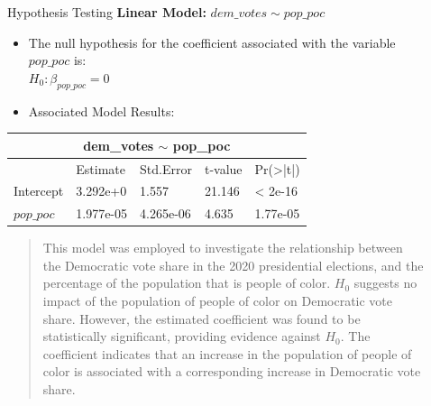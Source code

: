 \documentclass[xcolor=dvipsnames]{beamer}
\newlength{\sepwid}
\newlength{\onecolwid}
\newlength{\twocolwid}
\begin{document}
\begin{frame}[t]
\begin{columns}[t]
\begin{column}{\onecolwid}

\begin{block}{Hypothesis Testing}
\textbf{Linear Model: } \newline
$dem\_votes \sim pop\_poc$ 
\begin{itemize}
\item [\textcolor{black}{\textbullet}] The null hypothesis for the coefficient associated with the variable $pop\_poc$ is: \\
$H_0: \beta_{pop\_poc} = 0$
\item [\textcolor{black}{\textbullet}] Associated Model Results:
\end{itemize}


\begin{tabular}{ |p{5.4cm}|p{5.5cm}|p{5cm}|p{4.5cm}|p{5cm}|}

 \hline
 \multicolumn{5}{|c|}{dem\_votes $\sim$ pop\_poc} \\
 \hline
 & Estimate &Std.Error &t-value & Pr(>|t|)\\
 \hline
 Intercept   & 3.292e+0    &1.557&   21.146 & < 2e-16\\
 \hline
 $pop\_poc$ &   1.977e-05  & 4.265e-06   &4.635 & 1.77e-05\\
 \hline
\end{tabular}

\begin{quote}
\textcolor{white}{\textbullet}This model was employed to investigate the relationship between the Democratic vote share in the 2020 presidential elections, and the percentage of the population that is people of color. $H_0$ suggests no impact of the population of people of color on Democratic vote share. However, the estimated coefficient was found to be statistically significant, providing evidence against $H_0$. The coefficient indicates that an increase in the population of people of color is associated with a corresponding increase in Democratic vote share.
\end{quote}
\end{block}


\end{column} %
\begin{column}{\sepwid}\end{column} %
\begin{column}{\twocolwid} %
\begin{columns}[t,totalwidth=\twocolwid] %
\begin{column}{\onecolwid}\vspace{-.6in} %


\end{column}
\end{columns}
\end{column}
\end{columns}
\end{frame}
\end{document}
